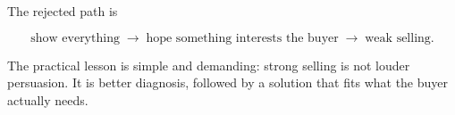 The rejected path is

\begin{equation}
\text{show everything}
\;\longrightarrow\;
\text{hope something interests the buyer}
\;\longrightarrow\;
\text{weak selling}.
\end{equation}

The practical lesson is simple and demanding: strong selling is not louder persuasion. It is better diagnosis, followed by a solution that fits what the buyer actually needs.